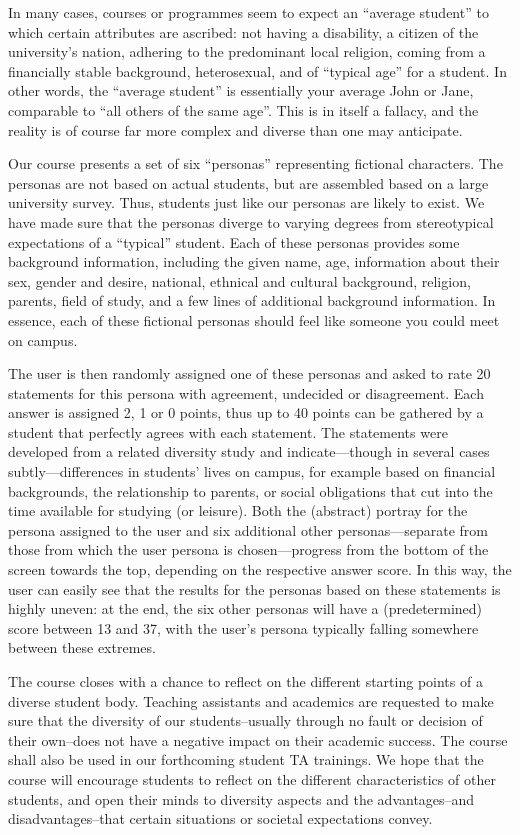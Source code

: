\documentclass[sigconf]{acmart}
\begin{document}
In many cases, courses or programmes seem to expect an ``average student'' to which certain attributes are ascribed: not having 
a disability, a citizen of the university's nation, adhering to the predominant local religion, coming from a financially
stable background, heterosexual, and of ``typical age'' for a student. In other words, the ``average student'' is essentially your
average John or Jane, comparable to ``all others of the same age''. This is in itself a fallacy, and the reality is of course far
more complex and diverse than one may anticipate.

Our course presents a set of six ``personas'' representing fictional characters. The personas are not based on actual students,
but are assembled based on a large university survey. Thus, students just like our personas are likely to exist.
We have made sure that the personas diverge to varying degrees from stereotypical expectations
of a ``typical'' student. Each of these personas provides some background information, including the
given name, age, information about their sex, gender and desire, national, ethnical and cultural background, religion,
parents, field of study, and a few lines of additional background information. In essence, each of these fictional personas
should feel like someone you could meet on campus.

The user is then randomly assigned one of these personas and asked to rate 20 statements for this persona with
agreement, undecided or disagreement. Each answer is assigned 2, 1 or 0 points, thus up to 40 points can be gathered by a student
that perfectly agrees with each statement. The statements were developed from a related diversity study and indicate---though in several
cases subtly---differences in students' lives on campus, for example based on financial backgrounds, the relationship to parents, or social
obligations that cut into the time available for studying (or leisure). Both the (abstract) portray for the persona assigned to the user 
and six additional other personas---separate from those from which the user persona is chosen---progress
from the bottom of the screen towards the top, depending on the respective answer score. In this way, the user can easily
see that the results for the personas based on these statements is highly uneven: at the end, the six other personas
will have a (predetermined) score between 13 and 37, with the user's persona typically falling somewhere between these extremes.

The course closes with a chance to reflect on the different starting points
of a diverse student body. Teaching assistants and academics are requested to make sure that the diversity of our
students--usually through no fault or decision of their own--does not have a negative impact on their academic success. The course
shall also be used in our forthcoming student TA trainings. We hope that the course will encourage students to reflect
on the different characteristics of other students, and open their minds to diversity aspects and the
advantages--and disadvantages--that certain situations or societal expectations convey.
\end{document}
